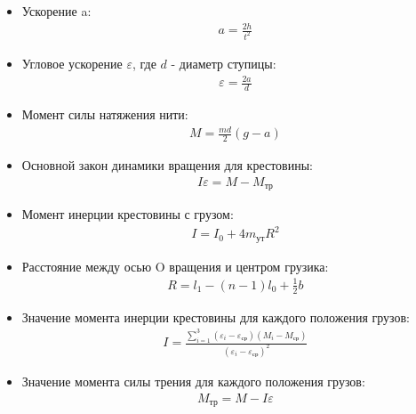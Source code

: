\documentclass[12pt]{article}
\begin{document}
\begin{enumerate}[label=\arabic*)]
\begin{itemize}
            
                \item Ускорение a:
                \begin{gather} 
                a = \frac{2h}{t^2}
                \end{gather}
                
                \item Угловое ускорение $\varepsilon$, где $d$ - диаметр ступицы:
                \begin{gather} 
                \varepsilon = \frac{2a}{d}
                \end{gather}
                
                \item Момент силы натяжения нити:
                \begin{gather} 
                M = \frac{md}{2}(g-a)
                \end{gather}
                
                \item Основной закон динамики вращения для крестовины:
                \begin{gather} 
                    I\varepsilon = M - M_{\text{тр}}
                \end{gather}
                
                \item Момент инерции крестовины с грузом:
                \begin{gather} 
                    I = I_0+4m_{\text{ут}}R^2
                \end{gather}
                
                \item Расстояние между осью O вращения и центром грузика:
                \begin{gather} 
                    R = l_1 - (n-1)l_0+ \frac{1}{2}b
                \end{gather}
                
                \item Значение момента инерции крестовины для каждого положения грузов:
                \begin{gather} 
                    I = \frac{\sum_{i=1}^3(\varepsilon_i-\varepsilon_{\text{ср}})(M_i-M_{\text{ср}})}{(\varepsilon_i-\varepsilon_{\text{ср}})^2}
                \end{gather}
                
                \item Значение момента силы трения для каждого положения грузов:
                \begin{gather} 
                    M_{\text{тр}} = M - I\varepsilon
                \end{gather}
            

\end{itemize}
\end{enumerate}
\end{document}
